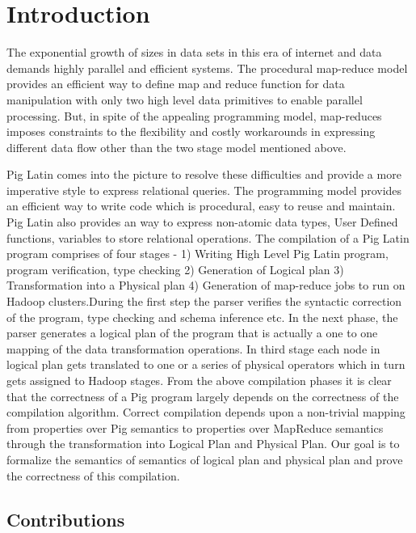 \section{Introduction}
\label{sec:intro}

{\bf}

The exponential growth of sizes in data sets in this era of internet and data demands highly parallel and efficient systems. The procedural map-reduce model provides an efficient way to define map and reduce function for data manipulation with only two high level data primitives to enable parallel processing. But, in spite of the appealing programming model, map-reduces imposes constraints to the flexibility and costly workarounds in expressing different data flow other than the two stage model mentioned above\cite{olston2008pig}.

Pig Latin comes into the picture to resolve these difficulties and provide a more imperative 
style to express relational queries. The programming model provides an efficient way to write code which is procedural, easy to reuse and maintain. Pig Latin also provides an way to express non-atomic data types, User Defined functions, variables to store relational operations. 
The compilation of a Pig Latin program comprises of four stages - 1) Writing High Level Pig Latin program, program verification, type checking 2) Generation of Logical plan 3) Transformation into a Physical plan 4) Generation of map-reduce jobs to run on Hadoop clusters\cite{gates2009building}.During the first step the parser verifies the syntactic correction of the program, type checking and schema inference etc. In the next phase, the parser generates a logical plan of the program that is actually a one to one mapping of the data transformation operations. In third stage each node in logical plan gets translated to one or a series of physical operators which in turn gets assigned to Hadoop stages.
From the above compilation phases it is clear that the correctness of a Pig program largely depends on the correctness of the compilation algorithm. Correct compilation depends upon a non-trivial mapping from properties over Pig semantics to properties over MapReduce semantics through the transformation into Logical Plan and Physical Plan. Our goal is to formalize the semantics of semantics of logical plan and physical plan and prove the correctness of this compilation.

\subsection{Contributions}
\label{subsec:contrib}

